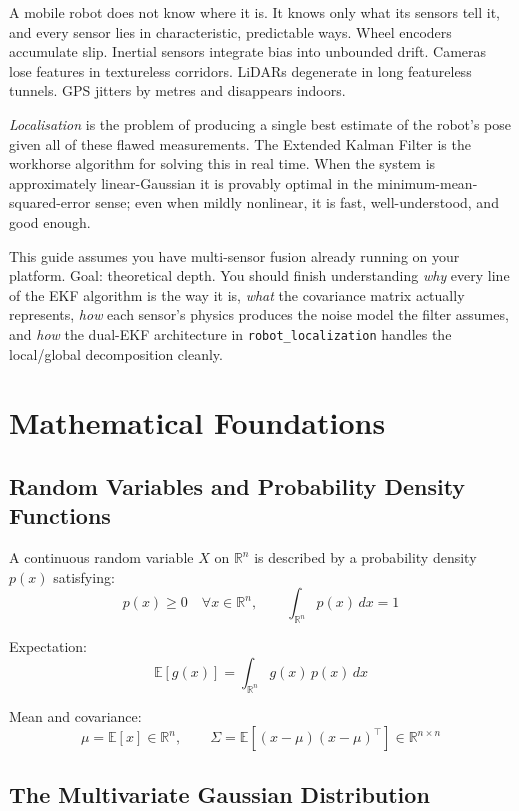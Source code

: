 \documentclass[11pt,a4paper]{article}
\begin{document}
A mobile robot does not know where it is. It knows only what its sensors tell it, and every sensor lies in characteristic, predictable ways. Wheel encoders accumulate slip. Inertial sensors integrate bias into unbounded drift. Cameras lose features in textureless corridors. LiDARs degenerate in long featureless tunnels. GPS jitters by metres and disappears indoors.

\emph{Localisation} is the problem of producing a single best estimate of the robot's pose given all of these flawed measurements. The Extended Kalman Filter is the workhorse algorithm for solving this in real time. When the system is approximately linear-Gaussian it is provably optimal in the minimum-mean-squared-error sense; even when mildly nonlinear, it is fast, well-understood, and good enough.

This guide assumes you have multi-sensor fusion already running on your platform. Goal: theoretical depth. You should finish understanding \emph{why} every line of the EKF algorithm is the way it is, \emph{what} the covariance matrix actually represents, \emph{how} each sensor's physics produces the noise model the filter assumes, and \emph{how} the dual-EKF architecture in \texttt{robot\_localization} handles the local/global decomposition cleanly.

\section{Mathematical Foundations}

\subsection{Random Variables and Probability Density Functions}

A continuous random variable $X$ on $\mathbb{R}^n$ is described by a probability density $p(x)$ satisfying:
\[
p(x) \geq 0 \quad \forall x \in \mathbb{R}^n, \qquad \int_{\mathbb{R}^n} p(x)\, dx = 1
\]

Expectation:
\[
\mathbb{E}[g(x)] = \int_{\mathbb{R}^n} g(x)\, p(x)\, dx
\]

Mean and covariance:
\[
\mu = \mathbb{E}[x] \in \mathbb{R}^n, \qquad \Sigma = \mathbb{E}[(x-\mu)(x-\mu)^\top] \in \mathbb{R}^{n\times n}
\]

\subsection{The Multivariate Gaussian Distribution}
\end{document}
